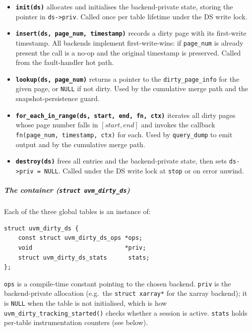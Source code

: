 \begin{itemize}
    \item \textbf{\texttt{init(ds)}} allocates and initialises the
          backend-private state, storing the pointer in \texttt{ds->priv}.
          Called once per table lifetime under the DS write lock.

    \item \textbf{\texttt{insert(ds, page\_num, timestamp)}} records a dirty
          page with its first-write timestamp.
          All backends implement first-write-wins: if \texttt{page\_num} is
          already present the call is a no-op and the original timestamp is
          preserved.
          Called from the fault-handler hot path.

    \item \textbf{\texttt{lookup(ds, page\_num)}} returns a pointer to the
          \texttt{dirty\_page\_info} for the given page, or \texttt{NULL} if
          not dirty.
          Used by the cumulative merge path and the snapshot-persistence guard.

    \item \textbf{\texttt{for\_each\_in\_range(ds, start, end, fn, ctx)}}
          iterates all dirty pages whose page number falls in
          $[\textit{start}, \textit{end}]$ and invokes the callback
          \texttt{fn(page\_num, timestamp, ctx)} for each.
          Used by \texttt{query\_dump} to emit output and by the cumulative
          merge path.

    \item \textbf{\texttt{destroy(ds)}} frees all entries and the
          backend-private state, then sets \texttt{ds->priv = NULL}.
          Called under the DS write lock at \texttt{stop} or on error
          unwind.
\end{itemize}

\subparagraph{The container (\texttt{struct uvm\_dirty\_ds})}

Each of the three global tables is an instance of:
\begin{verbatim}
struct uvm_dirty_ds {
    const struct uvm_dirty_ds_ops *ops;
    void                          *priv;
    struct uvm_dirty_ds_stats      stats;
};
\end{verbatim}
\texttt{ops} is a compile-time constant pointing to the chosen backend.
\texttt{priv} is the backend-private allocation (e.g.\ the \texttt{struct
xarray*} for the xarray backend); it is \texttt{NULL} when the table is not
initialised, which is how \texttt{uvm\_dirty\_tracking\_started()} checks
whether a session is active.
\texttt{stats} holds per-table instrumentation counters (see below).

